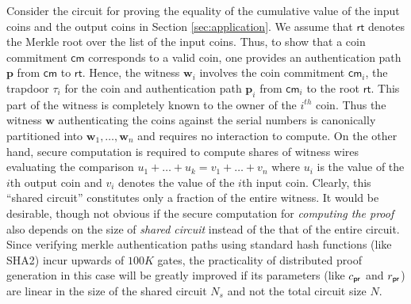 Consider the circuit for proving the equality of the cumulative value of the input coins and the output coins in Section \ref{sec:application}. We assume that $\mathsf{rt}$ denotes the Merkle
root over the list of the input coins. Thus, to show that a coin commitment $\mathsf{cm}$ corresponds to a valid coin, one provides an authentication path $\bm{p}$ from $\mathsf{cm}$ to $\mathsf{rt}$. Hence, the witness $\bm{w}_i$ involves the coin commitment $\mathsf{cm}_i$, the trapdoor $\tau_i$ for the coin and authentication path $\bm{p}_i$ from $\mathsf{cm}_i$ to the root $\mathsf{rt}$. This part of the witness is completely known to the owner of the $i^{th}$ coin. Thus the witness $\bm{w}$ authenticating the coins against the serial numbers is canonically partitioned into $\bm{w}_1,\ldots,\bm{w}_n$
and requires no interaction to compute. On the other hand, secure computation is required to compute shares of witness wires evaluating the comparison $u_1+\ldots+u_k = v_1+\ldots+v_n$ where $u_i$ is the value of the $i$th output coin and $v_i$ denotes the value of the $i$th input coin. Clearly, this ``shared circuit'' 
constitutes only a fraction of the entire witness. It would be desirable, though not obvious if the secure computation for {\em computing the proof} 
also depends on the size of {\em shared circuit} instead of the that of the entire circuit. Since verifying merkle authentication paths using 
standard hash functions (like SHA2) incur upwards of $100K$ gates, the practicality of distributed proof generation in this case will be
greatly improved if its parameters (like $c_\mathsf{pr}$ and $r_\mathsf{pr}$) are 
linear in the size of the shared circuit $N_s$ and not the total circuit size $N$.
